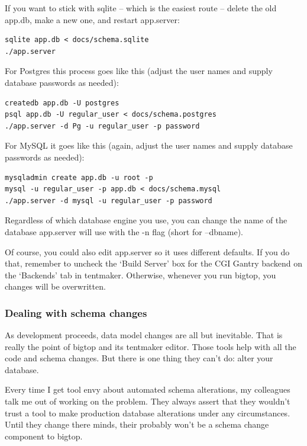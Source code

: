 If you want to stick with sqlite -- which is the easiest route -- delete
the old app.db, make a new one, and restart app.server:

\begin{verbatim}
sqlite app.db < docs/schema.sqlite
./app.server
\end{verbatim}

For Postgres this process goes like this (adjust the user names and
supply database passwords as needed):

\begin{verbatim}
createdb app.db -U postgres
psql app.db -U regular_user < docs/schema.postgres 
./app.server -d Pg -u regular_user -p password
\end{verbatim}

For MySQL it goes like this (again, adjust the user names and supply
database passwords as needed):

\begin{verbatim}
mysqladmin create app.db -u root -p
mysql -u regular_user -p app.db < docs/schema.mysql
./app.server -d mysql -u regular_user -p password
\end{verbatim}

Regardless of which database engine you use, you can change the name of
the database app.server will use with the -n flag (short for --dbname).

Of course, you could also edit app.server so it uses different defaults.
If you do that, remember to uncheck the `Build Server' box for the
CGI Gantry backend on the `Backends' tab in tentmaker.  Otherwise, whenever
you run bigtop, you changes will be overwritten.

\subsubsection*{Dealing with schema changes}

As development proceeds, data model changes are all but inevitable.
That is really the point of bigtop and its tentmaker editor.  Those
tools help with all the code and schema changes.  But there is one
thing they can't do: alter your database.

Every time I get tool envy about automated schema alterations, my
colleagues talk me out of working on the problem.  They always assert
that they wouldn't trust a tool to make production database alterations
under any circumstances.  Until they change there minds, their probably
won't be a schema change component to bigtop.

